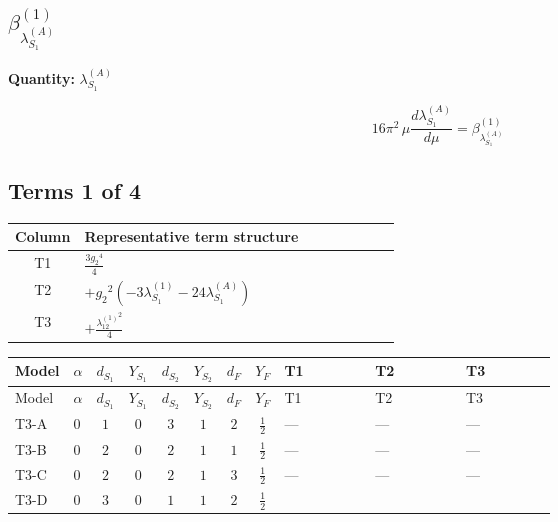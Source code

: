 \documentclass[8pt]{article}
\begin{document}
\begin{landscape}
\section*{$\beta_{\lambda_{S_1}^{(A)}}^{(1)}$}
\noindent\textbf{Quantity: }$\lambda_{S_1}^{(A)}$\par\smallskip
\[16\pi^2\,\mu\frac{d \lambda_{S_1}^{(A)}}{d\mu}=\beta_{\lambda_{S_1}^{(A)}}^{(1)}\]
\subsection*{Terms 1 of 4}
\begin{center}
\begin{tabular}{@{}c >{\raggedright\arraybackslash}p{0.82\linewidth}@{}}
\toprule
Column & Representative term structure \\
\midrule
T1 & \(\displaystyle \frac{3 {g_2}^4}{4}\) \\
\midrule
T2 & \(\displaystyle +{g_2}^2 (-3 {\lambda_{S_1}^{(1)}}-24 {\lambda_{S_1}^{(A)}})\) \\
\midrule
T3 & \(\displaystyle +\frac{{\lambda_{12}^{(1)}}^2}{4}\) \\
\midrule
\bottomrule
\end{tabular}
\end{center}
\smallskip
\tiny
\begin{longtable}{@{}llcccccc >{\raggedright\arraybackslash}p{0.21\linewidth} >{\raggedright\arraybackslash}p{0.21\linewidth} >{\raggedright\arraybackslash}p{0.21\linewidth}@{}}
\toprule
Model & $\alpha$ & $d_{S_1}$ & $Y_{S_1}$ & $d_{S_2}$ & $Y_{S_2}$ & $d_F$ & $Y_F$ & T1 & T2 & T3 \\
\midrule
\endfirsthead
\toprule
Model & $\alpha$ & $d_{S_1}$ & $Y_{S_1}$ & $d_{S_2}$ & $Y_{S_2}$ & $d_F$ & $Y_F$ & T1 & T2 & T3 \\
\midrule
\endhead
T3-A & $0$ & $1$ & $0$ & $3$ & $1$ & $2$ & $\frac{1}{2}$ & --- & --- & --- \\
\midrule
T3-B & $0$ & $2$ & $0$ & $2$ & $1$ & $1$ & $\frac{1}{2}$ & --- & --- & --- \\
\midrule
T3-C & $0$ & $2$ & $0$ & $2$ & $1$ & $3$ & $\frac{1}{2}$ & --- & --- & --- \\
\midrule
T3-D & $0$ & $3$ & $0$ & $1$ & $1$ & $2$ & $\frac{1}{2}$ & \scriptsize\adjustbox{max width=\linewidth}{$\begin{gathered} \frac{3 {g_2}^4}{4}\end{gathered}$} & \scriptsize\adjustbox{max width=\linewidth}{$\begin{gathered} +{g_2}^2 (-3 {\lambda_{S_1}^{(1)}}-24 {\lambda_{S_1}^{(A)}})\end{gathered}$} & \scriptsize\adjustbox{max width=\linewidth}{$\begin{gathered} +\frac{{\lambda_{12}^{(1)}}^2}{4}\end{gathered}$} \\

\end{longtable}
\end{landscape}
\end{document}
